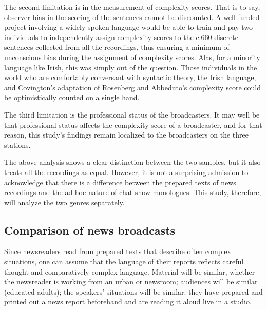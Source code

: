 \documentclass[output=paper,colorlinks,citecolor=brown]{langscibook}
\begin{document}
The second limitation is in the measurement of complexity scores. That is to say, observer bias in the scoring of the sentences cannot be discounted. A well-funded project involving a widely spoken language would be able to train and pay two individuals to independently assign complexity scores to the c.660 discrete sentences collected from all the recordings, thus ensuring a minimum of unconscious bias during the assignment of complexity scores. Alas, for a minority language like Irish, this was simply out of the question. Those individuals in the world who are comfortably conversant with syntactic theory, the Irish language, and Covington's adaptation of Rosenberg and Abbeduto's complexity score could be optimistically counted on a single hand.

The third limitation is the professional status of the broadcasters. It may well be that professional status affects the complexity score of a broadcaster, and for that reason, this study's findings remain localized to the broadcasters on the three stations.

The above analysis shows a clear distinction between the two samples, but it also treats all the recordings as equal. However, it is not a surprising admission to acknowledge that there is a difference between the prepared texts of news recordings and the ad-hoc nature of chat show monologues. This study, therefore, will analyze the two genres separately.

\subsection{Comparison of news broadcasts}

Since newsreaders read from prepared texts that describe often complex situations, one can assume that the language of their reports reflects careful thought and comparatively complex language. Material will be similar, whether the newsreader is working from an urban or  newsroom; audiences will be similar (educated adults); the speakers' situations will be similar: they have prepared and printed out a news report beforehand and are reading it aloud live in a studio. 
\end{document}
